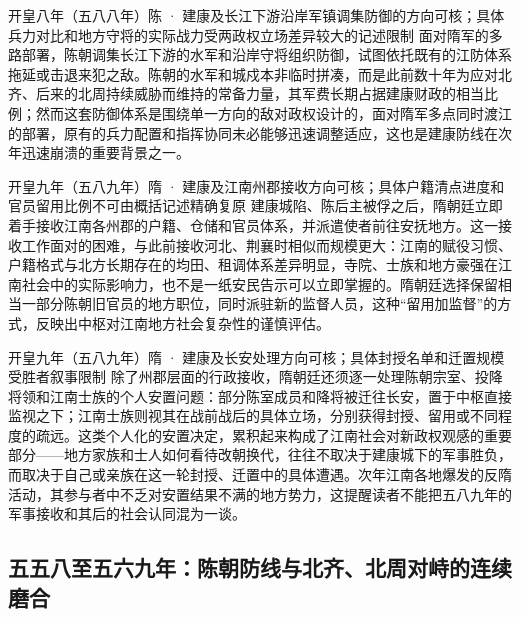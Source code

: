 \begin{event}{}{开皇八年（五八八年）}{陈 · 建康及长江下游沿岸军镇}{调集防御的方向可核；具体兵力对比和地方守将的实际战力受两政权立场差异较大的记述限制}
面对隋军的多路部署，陈朝调集长江下游的水军和沿岸守将组织防御，试图依托既有的江防体系拖延或击退来犯之敌。陈朝的水军和城戍本非临时拼凑，而是此前数十年为应对北齐、后来的北周持续威胁而维持的常备力量，其军费长期占据建康财政的相当比例；然而这套防御体系是围绕单一方向的敌对政权设计的，面对隋军多点同时渡江的部署，原有的兵力配置和指挥协同未必能够迅速调整适应，这也是建康防线在次年迅速崩溃的重要背景之一。
\end{event}

\begin{event}{}{开皇九年（五八九年）}{隋 · 建康及江南州郡}{接收方向可核；具体户籍清点进度和官员留用比例不可由概括记述精确复原}
建康城陷、陈后主被俘之后，隋朝廷立即着手接收江南各州郡的户籍、仓储和官员体系，并派遣使者前往安抚地方。这一接收工作面对的困难，与此前接收河北、荆襄时相似而规模更大：江南的赋役习惯、户籍格式与北方长期存在的均田、租调体系差异明显，寺院、士族和地方豪强在江南社会中的实际影响力，也不是一纸安民告示可以立即掌握的。隋朝廷选择保留相当一部分陈朝旧官员的地方职位，同时派驻新的监督人员，这种“留用加监督”的方式，反映出中枢对江南地方社会复杂性的谨慎评估。
\end{event}

\begin{event}{}{开皇九年（五八九年）}{隋 · 建康及长安}{处理方向可核；具体封授名单和迁置规模受胜者叙事限制}
除了州郡层面的行政接收，隋朝廷还须逐一处理陈朝宗室、投降将领和江南士族的个人安置问题：部分陈室成员和降将被迁往长安，置于中枢直接监视之下；江南士族则视其在战前战后的具体立场，分别获得封授、留用或不同程度的疏远。这类个人化的安置决定，累积起来构成了江南社会对新政权观感的重要部分——地方家族和士人如何看待改朝换代，往往不取决于建康城下的军事胜负，而取决于自己或亲族在这一轮封授、迁置中的具体遭遇。次年江南各地爆发的反隋活动，其参与者中不乏对安置结果不满的地方势力，这提醒读者不能把五八九年的军事接收和其后的社会认同混为一谈。
\end{event}

\subsection{五五八至五六九年：陈朝防线与北齐、北周对峙的连续磨合}

